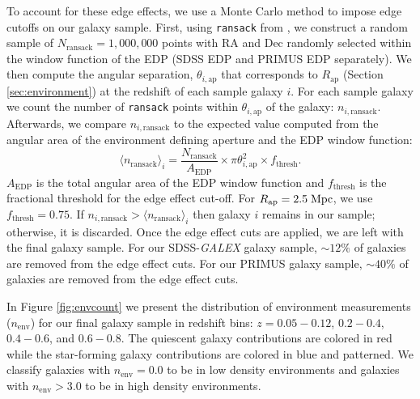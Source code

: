 To account for these edge effects, we use a Monte Carlo method to impose edge cutoffs on our galaxy sample. First, using \texttt{ransack} from \cite{Swanson:2008aa}, we construct a random sample of  $N_{\mathrm{ransack}} = 1,000,000$ points with RA and Dec randomly selected within the window function of the EDP (SDSS EDP and PRIMUS EDP separately). We then compute the angular separation, $\theta_{i, \mathrm{ap}}$ that corresponds to $R_{\mathrm{ap}}$ (Section \ref{sec:environment}) at the redshift of each sample galaxy $i$. For each sample galaxy we count the number of \texttt{ransack} points within $\theta_{i, \mathrm{ap}}$ of the galaxy: $n_{i,\mathrm{ransack}}$. Afterwards, we compare $n_{i,\mathrm{ransack}}$ to the expected value computed from the angular area of the environment defining aperture and the EDP window function: 
\begin{equation} \label{eq:ransack}
\langle n_{\mathrm{ransack}}\rangle_{i} = \frac{N_{\mathrm{ransack}}}{A_{\mathrm{EDP}}}\times {\pi \theta_{i, \mathrm{ap}}^2} \times f_{\mathrm{thresh}}. 
\end{equation} 
$A_{\mathrm{EDP}}$ is the total angular area of the EDP window function and $f_{\mathrm{thresh}}$ is the fractional threshold for the edge effect cut-off. For $R_{\mathrm{ap}}= 2.5 \;\mathrm{Mpc}$, we use $f_{\mathrm{thresh}} = 0.75$. If $n_{i, \mathrm{ransack}} > \langle n_{\mathrm{ransack}} \rangle_i$ then galaxy $i$ remains in our sample; otherwise, it is discarded. Once the edge effect cuts are applied, we are left with the final galaxy sample. For our SDSS-{\em GALEX} galaxy sample, $\sim 12 \%$ of galaxies are removed from the edge effect cuts. For our PRIMUS galaxy sample, $\sim 40 \%$ of galaxies are removed from the edge effect cuts. 

In Figure \ref{fig:envcount} we present the distribution of environment measurements ($n_{\mathrm{env}}$) for our final galaxy sample in redshift bins: $z = 0.05 - 0.12$, $0.2 - 0.4$, $0.4-0.6$, and $0.6-0.8$. The quiescent galaxy contributions are colored in red while the star-forming galaxy contributions are colored in blue and patterned. We classify galaxies with $n_{\mathrm{env}} = 0.0$ to be in low density environments and galaxies with $n_{\mathrm{env}} > 3.0$ to be in high density environments. 

